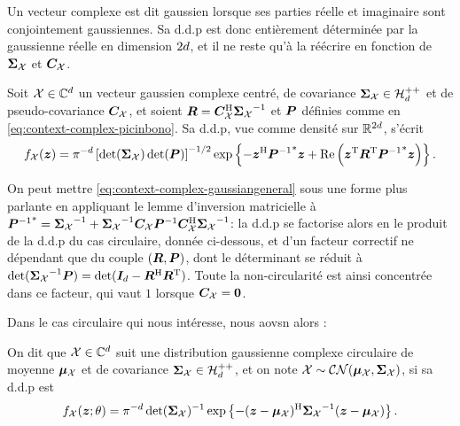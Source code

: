 Un vecteur complexe est dit gaussien lorsque ses parties réelle et imaginaire sont conjointement gaussiennes. Sa d.d.p est donc entièrement déterminée par la gaussienne réelle en dimension $2d$, et il ne reste qu'à la réécrire en fonction de $\boldsymbol{\Sigma}_{\mathcal{X}}$ et $\boldsymbol{C}_{\mathcal{X}}$.

\begin{proposition}
\label{prop:context-complex-gaussianpdf}
  Soit $\mathcal{X}\in\mathbb{C}^d$ un vecteur gaussien complexe centré, de covariance $\boldsymbol{\Sigma}_{\mathcal{X}}\in\mathcal{H}_{d}^{++}$ et de pseudo-covariance $\boldsymbol{C}_{\mathcal{X}}$, et soient $\boldsymbol{R}=\boldsymbol{C}_{\mathcal{X}}^{\mathrm{H}}{\boldsymbol{\Sigma}_{\mathcal{X}}}^{-1}$ et $\boldsymbol{P}$ définies comme en \cref{eq:context-complex-picinbono}. Sa d.d.p, vue comme densité sur $\mathbb{R}^{2d}$, s'écrit
\begin{equation}
  f_{\mathcal{X}}(\boldsymbol{z})
  =
  \pi^{-d}
  \left[\operatorname{\operatorname{det}}(\boldsymbol{\Sigma}_{\mathcal{X}})\operatorname{\operatorname{det}}(\boldsymbol{P})\right]^{-1/2}
  \exp\left\{
    -\boldsymbol{z}^{\mathrm{H}}{{\boldsymbol{P}}^{-1}}^{*}\boldsymbol{z}
    + \operatorname{\operatorname{Re}}\left(\boldsymbol{z}^{\mathrm{T}}\boldsymbol{R}^{\mathrm{T}}{{\boldsymbol{P}}^{-1}}^{*}\boldsymbol{z}\right)
  \right\}.
  \label{eq:context-complex-gaussiangeneral}
\end{equation}
\end{proposition}

\begin{remark}
  On peut mettre \cref{eq:context-complex-gaussiangeneral} sous une forme plus parlante en appliquant le lemme d'inversion matricielle à ${{\boldsymbol{P}}^{-1}}^{*} = {\boldsymbol{\Sigma}_{\mathcal{X}}}^{-1} + {\boldsymbol{\Sigma}_{\mathcal{X}}}^{-1}\boldsymbol{C}_{\mathcal{X}}{\boldsymbol{P}}^{-1}\boldsymbol{C}_{\mathcal{X}}^{\mathrm{H}}{\boldsymbol{\Sigma}_{\mathcal{X}}}^{-1}$: la d.d.p se factorise alors en le produit de la d.d.p du cas circulaire, donnée ci-dessous, et d'un facteur correctif ne dépendant que du couple $(\boldsymbol{R},\boldsymbol{P})$, dont le déterminant se réduit à $\operatorname{\operatorname{det}}({\boldsymbol{\Sigma}_{\mathcal{X}}}^{-1}\boldsymbol{P}) = \operatorname{\operatorname{det}}(\boldsymbol{I}_{d}-\boldsymbol{R}^{\mathrm{H}}\boldsymbol{R}^{\mathrm{T}})$. Toute la non-circularité est ainsi concentrée dans ce facteur, qui vaut $1$ lorsque $\boldsymbol{C}_{\mathcal{X}}=\boldsymbol{0}$.
\end{remark}

Dans le cas circulaire qui nous intéresse, nous aovsn alors :

\begin{definition}
\label{def:context-complex-cgaussian}
  On dit que $\mathcal{X}\in\mathbb{C}^d$ suit une distribution gaussienne complexe circulaire de moyenne $\boldsymbol{\mu}_{\mathcal{X}}$ et de covariance $\boldsymbol{\Sigma}_{\mathcal{X}}\in\mathcal{H}_{d}^{++}$, et on note $\mathcal{X}\sim\mathcal{CN}(\boldsymbol{\mu}_{\mathcal{X}},\boldsymbol{\Sigma}_{\mathcal{X}})$, si sa d.d.p est
\begin{equation}
  f_{\mathcal{X}}(\boldsymbol{z};\theta)
  =
  \pi^{-d}\operatorname{\operatorname{det}}(\boldsymbol{\Sigma}_{\mathcal{X}})^{-1}
  \exp\left\{-(\boldsymbol{z}-\boldsymbol{\mu}_{\mathcal{X}})^{\mathrm{H}} {\boldsymbol{\Sigma}_{\mathcal{X}}}^{-1} (\boldsymbol{z}-\boldsymbol{\mu}_{\mathcal{X}})\right\}.
  \label{eq:context-complex-cgaussianpdf}
\end{equation}
\end{definition}

